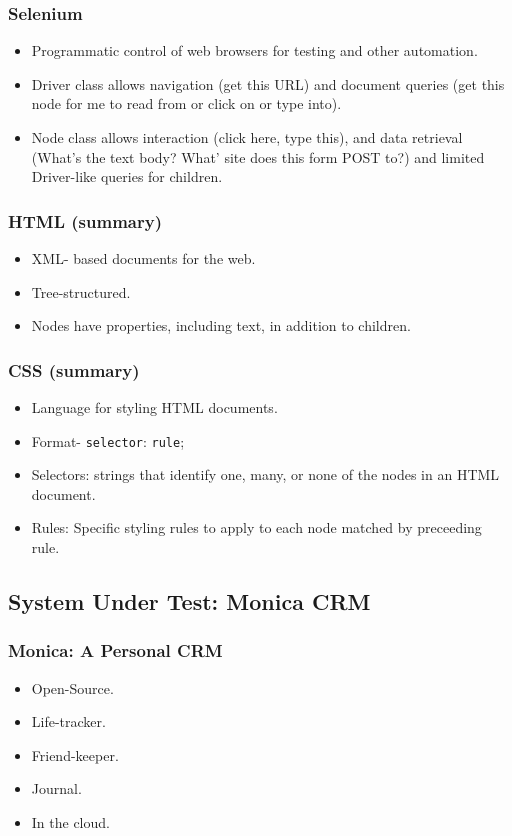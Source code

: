 \begin{frame}
  \frametitle{Selenium}
  \begin{itemize}
    \item Programmatic control of web browsers for testing and other automation.
    \item Driver class allows navigation (get this URL) and document queries (get this node for me to read from or click on or type into).
    \item Node class allows interaction (click here, type this), and data retrieval (What's the text body? What' site does this form POST to?) and limited Driver-like queries for children.
  \end{itemize}
\end{frame}

\begin{frame}
  \frametitle{HTML (summary)}
  \begin{itemize}
    \item XML- based documents for the web.
    \item Tree-structured.
    \item Nodes have properties, including text, in addition to children.
  \end{itemize}
\end{frame}

\begin{frame}
  \frametitle{CSS (summary)}
  \begin{itemize}
    \item Language for styling HTML documents.
    \item Format- \texttt{selector}: \texttt{rule};
    \item Selectors: strings that identify one, many, or none of the nodes in an HTML document.
    \item Rules: Specific styling rules to apply to each node matched by preceeding rule.
  \end{itemize}
\end{frame}

\subsection{System Under Test: Monica CRM}
\begin{frame}
  \frametitle{Monica: A Personal CRM}
  \begin{itemize}
    \item Open-Source.
    \item Life-tracker.
    \item Friend-keeper.
    \item Journal.
    \item In the cloud.
  \end{itemize}
\end{frame}

